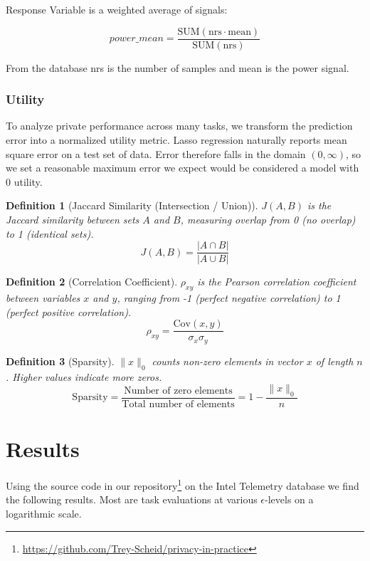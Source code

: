 \documentclass[12pt,letterpaper]{article}
\newtheorem{definition}{Definition}
\begin{document}
Response Variable is a weighted average of signals:

\[power\_mean = \frac{\text{SUM}(\text{nrs} \cdot \text{mean})}{\text{SUM}(\text{nrs})}\]

From the database nrs is the number of samples and mean is the power signal. 

\subsubsection{Utility}

To analyze private performance across many tasks, we transform the prediction error into a normalized utility metric. Lasso regression naturally reports mean square error on a test set of data. Error therefore falls in the domain $(0, \infty)$, so we set a reasonable maximum error we expect would be considered a model with 0 utility. 

\begin{definition}[Jaccard Similarity (Intersection / Union)]
    \label{def:sim}
    $J(A, B)$ is the Jaccard similarity between sets $A$ and $B$, measuring overlap from 0 (no overlap) to 1 (identical sets).
    \[J(A, B) = \frac{|A \cap B|}{|A \cup B|} \]
\end{definition}

\begin{definition}[Correlation Coefficient]
    \label{def:r2}
    $\rho_{xy}$ is the Pearson correlation coefficient between variables $x$ and $y$, ranging from -1 (perfect negative correlation) to 1 (perfect positive correlation).
    \[\rho_{xy} = \frac{\text{Cov}(x,y)}{\sigma_x \sigma_y}\]
\end{definition}

\begin{definition}[Sparsity]
    \label{def:sparsity}
    $\|x\|_0$ counts non-zero elements in vector $x$ of length $n$. Higher values indicate more zeros.
    \[\text{Sparsity} = \frac{\text{Number of zero elements}}{\text{Total number of elements}} = 1 - \frac{\|x\|_0}{n}\]
\end{definition}



\section{Results}

Using the source code in our repository\footnote{\url{https://github.com/Trey-Scheid/privacy-in-practice}} on the Intel Telemetry database we find the following results. Most are task evaluations at various $\epsilon$-levels on a logarithmic scale.
\end{document}
